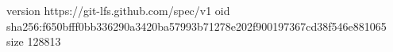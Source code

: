 version https://git-lfs.github.com/spec/v1
oid sha256:f650bfff0bb336290a3420ba57993b71278e202f900197367cd38f546e881065
size 128813

